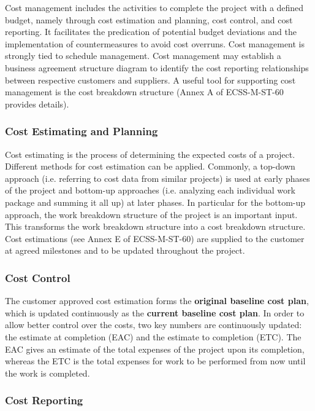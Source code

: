 Cost management includes the activities to complete the project with a defined budget, namely through cost estimation and planning, cost control, and cost reporting. It facilitates the predication of potential budget deviations and the implementation of countermeasures to avoid cost overruns. Cost management is strongly tied to schedule management. Cost management may establish a business agreement structure diagram to identify the cost reporting relationships between respective customers and suppliers. A useful tool for supporting cost management is the cost breakdown structure (Annex A of ECSS-M-ST-60 provides details).

\subsubsection{Cost Estimating and Planning}

Cost estimating is the process of determining the expected costs of a project. Different methods for cost estimation can be applied. Commonly, a top-down approach (i.e. referring to cost data from similar projects) is used at early phases of the project and bottom-up approaches (i.e. analyzing each individual work package and summing it all up) at later phases. In particular for the bottom-up approach, the work breakdown structure of the project is an important input. This transforms the work breakdown structure into a cost breakdown structure. Cost estimations (see Annex E of ECSS-M-ST-60) are supplied to the customer at agreed milestones and to be updated throughout the project.

\subsubsection{Cost Control}

The customer approved cost estimation forms the \textbf{original baseline cost plan}, which is updated continuously as the \textbf{current baseline cost plan}. In order to allow better control over the costs, two key numbers are continuously updated: the estimate at completion (EAC) and the estimate to completion (ETC). The EAC gives an estimate of the total expenses of the project upon its completion, whereas the ETC is the total expenses for work to be performed from now until the work is completed.

\subsubsection{Cost Reporting}

